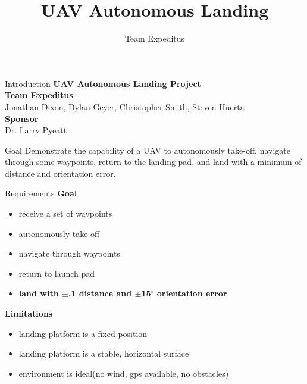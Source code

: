\documentclass[11pt]{beamer}
\author{Team Expeditus}
\title{UAV Autonomous Landing}
\institute{SDSMT MCS}
\begin{document}
\begin{frame}
\titlepage
\end{frame}


\begin{frame}{Introduction}
\textbf{UAV Autonomous Landing Project}\\
\vspace{12mm}
\textbf{Team Expeditus}\\
Jonathan Dixon, Dylan Geyer, Christopher Smith, Steven Huerta\\ 
\vspace{6mm}
\textbf{Sponsor}\\
Dr. Larry Pyeatt\\
\end{frame}


\begin{frame}{Goal}
Demonstrate the capability of a UAV to autonomously take-off, navigate through some waypoints, return to the landing pad, and land with a minimum of distance and orientation error. 
\end{frame}


\begin{frame}{Requirements}
\textbf{Goal}\\
\begin{itemize}
\item receive a set of waypoints
\item autonomously take-off
\item navigate through waypoints
\item return to launch pad
\item \textbf{land with $\pm$.1 distance and $\pm$15$^{\circ}$ orientation error}
\end{itemize}
\vspace{6mm}
\textbf{Limitations}\\
\begin{itemize}
\item landing platform is a fixed position
\item landing platform is a stable, horizontal surface
\item environment is ideal(no wind, gps available, no obstacles)
\end{itemize}
\end{frame}
\end{document}
